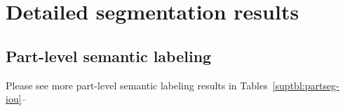 \section{Detailed segmentation results}
\label{supsec:segmentation-detail}




\subsection{Part-level semantic labeling}
\label{supsec:results:semantic-segmentation}

Please see more part-level semantic labeling results in Tables~\ref{suptbl:partseg-iou}--


